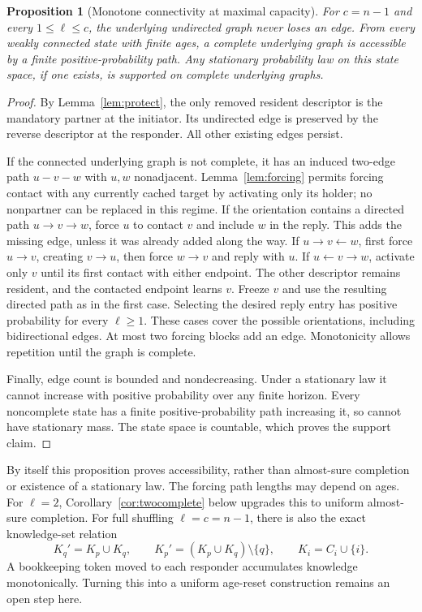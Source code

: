 \documentclass[11pt]{article}
\newtheorem{proposition}[theorem]{Proposition}
\begin{document}
\begin{proposition}[Monotone connectivity at maximal capacity]
\label{prop:maxcapacity}
For $c=n-1$ and every $1\le\ell\le c$, the underlying undirected
graph never loses an edge. From every weakly connected state
with finite ages, a complete underlying graph is accessible by
a finite positive-probability path. Any stationary probability
law on this state space, if one exists, is supported on complete
underlying graphs.
\end{proposition}
\begin{proof}
By Lemma~\ref{lem:protect}, the only removed resident descriptor
is the mandatory partner at the initiator. Its undirected edge
is preserved by the reverse descriptor at the responder.
All other existing edges persist.

If the connected underlying graph is not complete, it has an
induced two-edge path $u-v-w$ with $u,w$ nonadjacent.
Lemma~\ref{lem:forcing} permits forcing contact with any
currently cached target by activating only its holder; no
nonpartner can be replaced in this regime.
If the orientation contains a directed path $u\to v\to w$,
force $u$ to contact $v$ and include $w$ in the reply. This
adds the missing edge, unless it was already added along the way.
If $u\to v\leftarrow w$, first force $u\to v$, creating
$v\to u$, then force $w\to v$ and reply with $u$.
If $u\leftarrow v\to w$, activate only $v$ until its first
contact with either endpoint. The other descriptor remains
resident, and the contacted endpoint learns $v$. Freeze $v$
and use the resulting directed path as in the first case.
Selecting the desired reply entry has positive probability for
every $\ell\ge1$. These cases cover the possible orientations,
including bidirectional edges. At most two forcing blocks add
an edge. Monotonicity allows repetition until the graph is complete.

Finally, edge count is bounded and nondecreasing. Under a
stationary law it cannot increase with positive probability
over any finite horizon. Every noncomplete state has a finite
positive-probability path increasing it, so cannot have stationary
mass. The state space is countable, which proves the support claim.
\end{proof}

By itself this proposition proves accessibility, rather than
almost-sure completion or existence of a stationary law.
The forcing path lengths may depend on ages. For $\ell=2$,
Corollary~\ref{cor:twocomplete} below upgrades this to uniform
almost-sure completion. For full shuffling
$\ell=c=n-1$, there is also the exact knowledge-set relation
\[
 K_q'=K_p\cup K_q,\qquad
 K_p'=(K_p\cup K_q)\setminus\{q\},
 \qquad K_i=C_i\cup\{i\}.
\]
A bookkeeping token moved to each responder accumulates knowledge
monotonically. Turning this into a uniform age-reset construction
remains an open step here.
\end{document}
